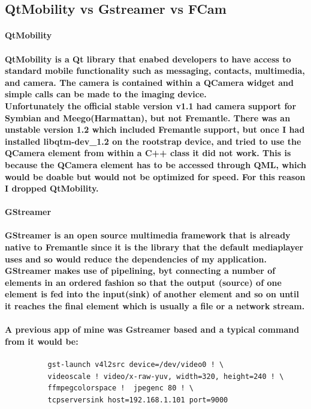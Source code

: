 \documentclass[11pt]{article} %
\begin{document}
\subsection{QtMobility vs Gstreamer vs FCam}
\paragraph{\bf{QtMobility}}
\paragraph{QtMobility is a Qt library that enabed developers to have access to standard mobile functionality such as messaging, contacts, multimedia, and camera.  The camera is contained within a QCamera widget and simple calls can be made to the imaging device.
\\Unfortunately the official stable version v1.1 had camera support for Symbian and Meego(Harmattan), but not Fremantle. There was an unstable version 1.2 which included Fremantle support, but once I had installed libqtm-dev\_1.2 on the rootstrap device, and tried to use the QCamera element from within a C++ class it did not work. This is because the QCamera element has to be accessed through QML, which would be doable but would not be optimized for speed. For this reason I dropped QtMobility.
}
\pagebreak %
\paragraph{\bf{GStreamer}}
\paragraph{GStreamer is an open source multimedia framework that is already native to Fremantle since it is the library that the default mediaplayer uses and so would reduce the dependencies of my application. GStreamer makes use of pipelining, byt connecting a number of elements in an ordered fashion so that the output (source) of one element is fed into the input(sink) of another element and so on until it reaches the final element which is usually a file or a network stream.
\\\\A previous app of mine was Gstreamer based and a typical command from it would be:
}
\begin{verbatim}
	      gst-launch v4l2src device=/dev/video0 ! \
	      videoscale ! video/x-raw-yuv, width=320, height=240 ! \
	      ffmpegcolorspace !  jpegenc 80 ! \
	      tcpserversink host=192.168.1.101 port=9000
\end{verbatim}
\end{document}
